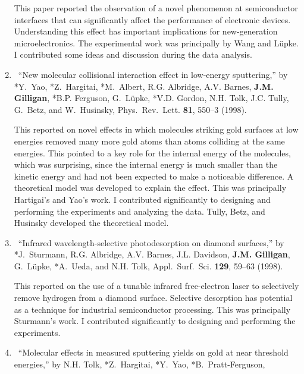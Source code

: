 \begin{enumerate}
	  \begin{credit}
	  This paper reported the observation of a novel phenomenon at semiconductor interfaces that can  significantly affect the performance of electronic devices. Understanding this effect has important implications for new-generation microelectronics.
	  The experimental work was principally by Wang and L\"upke. I contributed some ideas and discussion during the data analysis.
	  \end{credit}
%	
	\item
	\textdagger\ 
	\enquote{New molecular collisional interaction effect in low-energy
	  sputtering,}  by *Y.~Yao, *Z.~Hargitai, *M.~Albert, R.G. Albridge, A.V.
	  Barnes, \textbf{J.M. Gilligan}, *B.P. Ferguson, G.~L\"upke, *V.D. Gordon, N.H. Tolk,
	  J.C. Tully, G.~Betz, and W.~Husinsky, Phys.\ Rev.\ Lett. \textbf{81}, 550--3
	  (1998).
	  \begin{credit}
	  This reported on novel effects in which molecules striking gold surfaces at low energies removed many more gold atoms than atoms colliding at the same energies. This pointed to a key role for the internal energy of the molecules, which was surprising, since the internal energy is much smaller than the kinetic energy and had not been expected to make a noticeable difference. A theoretical model was developed to explain the effect.
	  This was principally Hartigai's and Yao's work. I contributed significantly to designing and performing the experiments and analyzing the data. Tully, Betz, and Husinsky developed the theoretical model.
	  \end{credit}
%	
	\item
	\textdagger\ 
	\enquote{Infrared wavelength-selective photodesorption on diamond surfaces,}
	  by *J.~Sturmann, R.G. Albridge, A.V. Barnes, J.L. Davidson, \textbf{J.M. Gilligan},
	  G.~L\"upke, *A.~Ueda, and N.H. Tolk, Appl.\ Surf.\ Sci. \textbf{129}, 59--63
	  (1998). 
	  \begin{credit}
	  This reported on the use of a tunable infrared free-electron laser to selectively remove hydrogen from a diamond surface. Selective desorption has potential as a technique for industrial semiconductor processing.
	  This was principally Sturmann's work. I contributed significantly to designing and performing the experiments.
	  \end{credit}
%	
	\item
	\textdagger\ 
	\enquote{Molecular effects in measured sputtering yields on gold at near
	  threshold energies,}  by N.H. Tolk, *Z.~Hargitai, *Y.~Yao, *B.~Pratt-Ferguson,

\end{enumerate}
